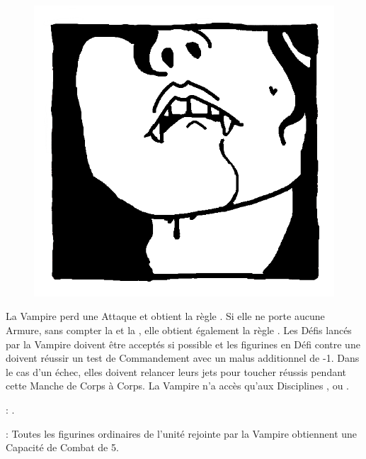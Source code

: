 \newpage
{}

\begin{figure}
\centering
\includegraphics[width=\logosize]{pics/logo_lamia.png}
\end{figure}
La Vampire perd une Attaque et obtient la règle \lightningreflexes{}. Si elle ne porte aucune Armure, sans compter la \mountsprotection{} et la \innatedefence{}, elle obtient également la règle \distracting{}. Les Défis lancés par la Vampire doivent être acceptés si possible et les figurines en Défi contre une \lamia{} doivent réussir un test de Commandement avec un malus additionnel de -1. Dans le cas d'un échec, elles doivent relancer leurs jets pour toucher réussis pendant cette Manche de Corps à Corps. La Vampire n'a accès qu'aux Disciplines \light{}, \shadows{} ou \necromancy{}.

\vspace{0.5cm}
\bloodties{} : \textbf{\courtofthedamned}.

\vspace{0.5cm}
\ancientbloodpower{} : \textbf{\commandment}\dotfill{}\newline%
Toutes les figurines ordinaires de l'unité rejointe par la Vampire obtiennent une Capacité de Combat de 5.


